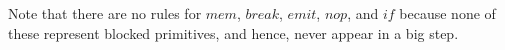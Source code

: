 Note that there are no rules for $mem$, $break$, $emit$, $nop$, and $if$ 
because none of these represent blocked primitives, and hence, never appear in 
a big step.

\begin{comment}

\textbf{(TODO) An example:}

{\small
\begin{verbatim}
    mem(1); emit a; mem(2); emit b; mem(3)
or (
    loop (mem(4); await a)
or
    await b; mem(5)
)
\end{verbatim}
}

$$
p = program
\ten
ext = external~event
$$

$$
*^1: \1 until \3 isBlocked(p'') \1\vee\1 (p''=nop)
$$
$$
*^2: \1 until \3 pop(p'')=(0,\emptyset)
$$

\subsection{Examples}

$$
\textbf{(seq)} \5
    \frac
    { \textbf{(await 1)} \3 await~A \xrightarrow{(A,0)} delay~0 }
    { (await~A~;~await~A) \xrightarrow{(A,0)} (delay~0~;~await~A) }
$$

$$
\textbf{(seq 1)} \5
    \frac
    {\textbf{(delay)} \5 (delay~0) \xrightarrow{0}
        nop \1\nearrow^{~\emptyset}}
    { (delay~0~;~await~A) \xrightarrow{0} (nop~;~await~A)
        \1\nearrow^{~\emptyset} }
$$

$$
\textbf{(seq 2)} \3 (nop~;~await~A) \xrightarrow{i}
                        await~A \1\nearrow^{~\emptyset}
$$

$$
\textbf{(loop 1)} \5
    \frac
    {\textbf{(if)} \5
        (if~...) \xrightarrow{(\_,0)} (if~...)}
    { loop~(if~...) \xrightarrow{(\_,0)}
        (if~mem(v)~then~break~else~await~A)~@~loop~(if~...)) }
$$

$$
\textbf{(if 0)} \3
    (if~mem(0)~then~p~else~q) \xrightarrow{i} q \1\nearrow^{~\emptyset}
\ten
\textbf{(if 1)} \3
    (if~mem(v)~then~p~else~q) \xrightarrow{i} p \1\nearrow^{~\emptyset}
        \1,\3 (v \neq 0)
$$

$$
\textbf{(loop 1)} \5
    \frac
    { \textbf{(if 1)} \3
    (if~mem(1)~...) \xrightarrow{0} break \1\nearrow^{~\emptyset} }
    { (if~mem(1)~...~@~loop~q) \xrightarrow{0} (break~@~loop~(if~...))
        \1\nearrow^{~\emptyset} }
$$


\end{comment}
